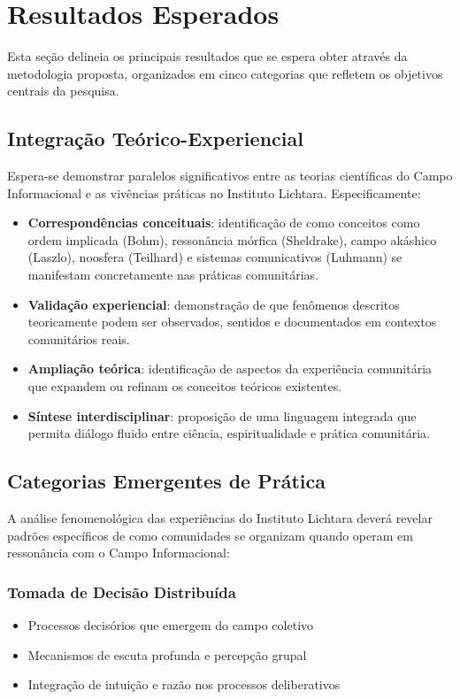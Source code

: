 \section{Resultados Esperados}

Esta seção delineia os principais resultados que se espera obter através da metodologia proposta, organizados em cinco categorias que refletem os objetivos centrais da pesquisa.

\subsection{Integração Teórico-Experiencial}

Espera-se demonstrar paralelos significativos entre as teorias científicas do Campo Informacional e as vivências práticas no Instituto Lichtara. Especificamente:

\begin{itemize}
    \item \textbf{Correspondências conceituais}: identificação de como conceitos como ordem implicada (Bohm), ressonância mórfica (Sheldrake), campo akáshico (Laszlo), noosfera (Teilhard) e sistemas comunicativos (Luhmann) se manifestam concretamente nas práticas comunitárias.
    
    \item \textbf{Validação experiencial}: demonstração de que fenômenos descritos teoricamente podem ser observados, sentidos e documentados em contextos comunitários reais.
    
    \item \textbf{Ampliação teórica}: identificação de aspectos da experiência comunitária que expandem ou refinam os conceitos teóricos existentes.
    
    \item \textbf{Síntese interdisciplinar}: proposição de uma linguagem integrada que permita diálogo fluido entre ciência, espiritualidade e prática comunitária.
\end{itemize}

\subsection{Categorias Emergentes de Prática}

A análise fenomenológica das experiências do Instituto Lichtara deverá revelar padrões específicos de como comunidades se organizam quando operam em ressonância com o Campo Informacional:

\subsubsection{Tomada de Decisão Distribuída}
\begin{itemize}
    \item Processos decisórios que emergem do campo coletivo
    \item Mecanismos de escuta profunda e percepção grupal
    \item Integração de intuição e razão nos processos deliberativos
\end{itemize}

